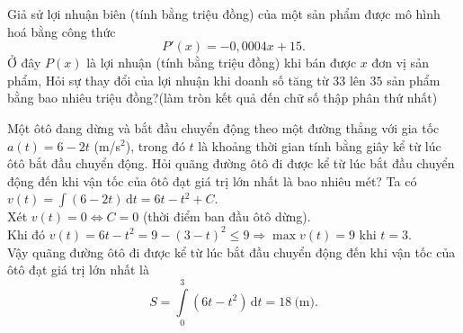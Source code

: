\begin{bt}%
	Giả sử lợi nhuận biên (tính bằng triệu đồng) của một sản phẩm được mô hình hoá bằng công thức 
	$$P'(x)=-0{,}0004x+15.$$
	Ở đây $P(x)$ là lợi nhuận (tính bằng triệu đồng) khi bán được $x$ đơn vị sản phẩm, Hỏi sự thay đổi của lợi nhuận khi doanh số tăng từ $33$ lên $35$ sản phẩm bằng bao nhiêu triệu đồng?(làm tròn kết quả đến chữ số thập phân thứ nhất) \\ 
\end{bt}

\begin{bt}%

Một ôtô đang dừng và bắt đầu chuyển động theo một đường thẳng với gia tốc $a(t)=6-2t$ (m/s$^2$), trong đó $t$ là khoảng thời gian tính bằng giây kể từ lúc ôtô bắt đầu chuyển động. Hỏi quãng đường ôtô đi được kể từ lúc bắt đầu chuyển động đến khi vận tốc của ôtô đạt giá trị lớn nhất là bao nhiêu mét?
{}
\loigiai
{
Ta có $v(t)=\displaystyle\int\limits (6-2t)\mathrm{\,d}t=6t-t^2+C$. \\
Xét $v(t)=0 \Leftrightarrow C=0$ (thời điểm ban đầu ôtô dừng).\\
Khi đó $v(t)=6t-t^2=9-\left(3-t\right)^2\leq 9\Rightarrow \max v(t)=9$ khi $t=3$.\\
Vậy quãng đường ôtô đi được kể từ lúc bắt đầu chuyển động đến khi vận tốc của ôtô đạt giá trị lớn nhất là
\[S=\displaystyle\int\limits_{0}^{3} \left(6t-t^2\right)\mathrm{\,d}t=18 \ \text{(m)}.\]
}
\end{bt}

